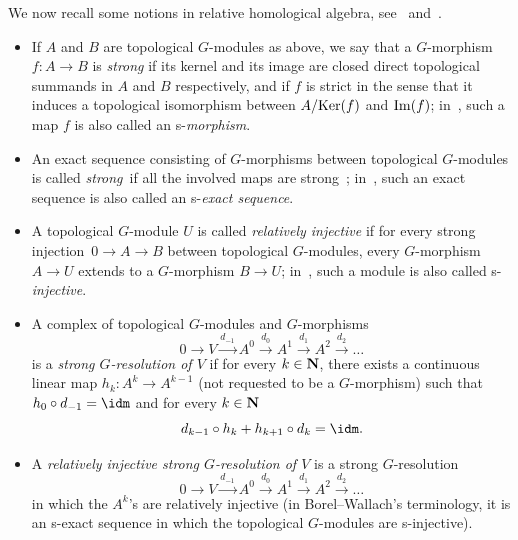 We now recall some notions in relative homological algebra, see~\cite[Chapter~I, \textsection~2 and Chapter~III, \textsection~1]{Gui} and~\cite[Chapter~IX, \textsection~1.5]{BW}.
\begin{itemize}
\item If $A$ and $B$ are topological $G$-modules as above, we say that a $G$-morphism $f : A \to B$ is \emph{strong} if its kernel and its image are closed direct topological summands in $A$ and $B$ respectively, and if $f$ is strict in the sense that it induces a topological isomorphism between $A/{\rm Ker}(f)$ and ${\rm Im}(f)$; in~\cite[Chapter~IX, \textsection~1.5, p.~172]{BW}, such a map $f$ is also called an s-\emph{morphism}.
\item An exact sequence consisting of $G$-morphisms between topological $G$-modules is called \emph{strong}~if all the involved maps are strong~; in~\cite[Chapter~IX, \textsection~1.5, p.~172]{BW}, such an exact sequence is also called an s-\emph{exact sequence}.
\item A topological $G$-module $U$ is called \emph{relatively injective} if for every strong injection~$0 \to A \to B$ between topological $G$-modules, every $G$-morphism $A \to U$ extends to a $G$-morphism $B \to U$; in~\cite[Chapter~IX, \textsection~1.5, p.~172]{BW}, such a module is also called s-\emph{injective}.

\item A complex of topological $G$-modules and $G$-morphisms
\[
0 \to V \stackrel{d_{-1}}{\to} A^0 \stackrel{d_0}{\to} A^1 \stackrel{d_1}{\to} A^2 \stackrel{d_2}{\to}\dots
\]
is a \emph{strong $G$-resolution of $V$} if for every $k \in {\bf N}$, there exists a continuous linear map $h_k: A^k \to A^{k-1}$ (not requested to be a $G$-morphism) such that $h _0 \circ d_{-1} = \idm$ and for every $k \in {\bf N}$
\[
d_{k-1} \circ h_k + h_{k+1} \circ d_k = \idm.
\]
\item A \emph{relatively injective strong $G$-resolution of $V$} is a strong $G$-resolution 
\[
0 \to V \stackrel{d_{-1}}{\to} A^0 \stackrel{d_0}{\to} A^1 \stackrel{d_1}{\to} A^2 \stackrel{d_2}{\to}\dots
\]
in which the $A^{k}$'s are relatively injective (in Borel--Wallach's terminology, it is an s-exact sequence in which the topological $G$-modules are s-injective).
\end{itemize}

